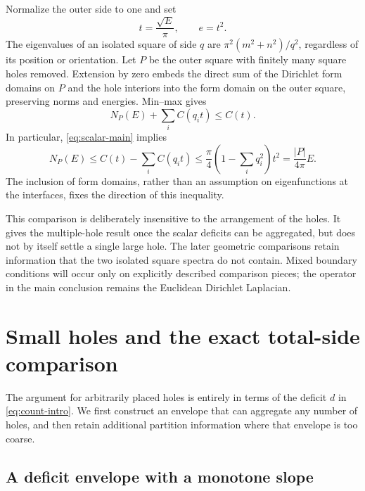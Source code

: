 \documentclass[11pt,reqno]{amsart}
\numberwithin{equation}{section}
\begin{document}
Normalize the outer side to one and set
\begin{equation}\label{eq:energy-normalization}
 t=\frac{\sqrt E}{\pi},\qquad e=t^2.
\end{equation}
The eigenvalues of an isolated square of side $q$ are
$\pi^2(m^2+n^2)/q^2$, regardless of its position or orientation.
Let $P$ be the outer square with finitely many square holes
removed. Extension by zero embeds the direct sum of the
Dirichlet form domains on $P$ and the hole interiors into the
form domain on the outer square, preserving norms and energies.
Min--max gives
\begin{equation}\label{eq:subtraction}
 N_P(E)+\sum_i C(q_it)\le C(t).
\end{equation}
In particular, \eqref{eq:scalar-main} implies
\begin{equation}\label{eq:subtraction-weyl}
 N_P(E)\le C(t)-\sum_iC(q_it)
 \le\frac\pi4\left(1-\sum_iq_i^2\right)t^2
 =\frac{|P|}{4\pi}E.
\end{equation}
The inclusion of form domains, rather than an assumption on
eigenfunctions at the interfaces, fixes the direction of this
inequality.

This comparison is deliberately insensitive to the arrangement of
the holes. It gives the multiple-hole result once the scalar deficits
can be aggregated, but does not by itself settle a single large hole.
The later geometric comparisons retain information that the two
isolated square spectra do not contain. Mixed boundary conditions will
occur only on explicitly described comparison pieces; the operator in
the main conclusion remains the Euclidean Dirichlet Laplacian.

\section{Small holes and the exact total-side comparison}\label{sec:holes}

The argument for arbitrarily placed holes is entirely in terms
of the deficit $d$ in \eqref{eq:count-intro}. We first construct
an envelope that can aggregate any number of holes, and then
retain additional partition information where that envelope is
too coarse.

\subsection*{A deficit envelope with a monotone slope}
\end{document}
